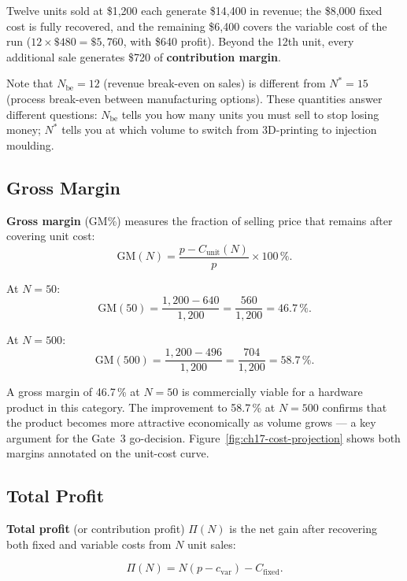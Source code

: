 Twelve units sold at \$1,200 each generate \$14,400 in revenue; the
\$8,000 fixed cost is fully recovered, and the remaining \$6,400 covers
the variable cost of the run ($12 \times \$480 = \$5{,}760$, with \$640
profit).
Beyond the 12th unit, every additional sale generates \$720 of
\textbf{contribution margin}.

Note that $N_{\text{be}} = 12$ (revenue break-even on sales) is different
from $N^{*} = 15$ (process break-even between manufacturing options).
These quantities answer different questions: $N_{\text{be}}$ tells you how
many units you must sell to stop losing money; $N^{*}$ tells you at which
volume to switch from 3D-printing to injection moulding.

\subsection{Gross Margin}
\label{sec:ch17-gm}

\textbf{Gross margin} (GM\%) measures the fraction of
selling price that remains after covering unit cost:
\[
  \text{GM}(N) = \frac{p - C_{\text{unit}}(N)}{p} \times 100\,\%.
\]

At $N = 50$:
\[
  \text{GM}(50) = \frac{1{,}200 - 640}{1{,}200}
               = \frac{560}{1{,}200} = 46.7\,\%.
\]

At $N = 500$:
\[
  \text{GM}(500) = \frac{1{,}200 - 496}{1{,}200}
                = \frac{704}{1{,}200} = 58.7\,\%.
\]

A gross margin of 46.7\,\% at $N = 50$ is commercially viable for a
hardware product in this category.
The improvement to 58.7\,\% at $N = 500$ confirms that the product becomes
more attractive economically as volume grows --- a key argument for the
Gate~3 go-decision.
Figure~\ref{fig:ch17-cost-projection} shows both margins annotated on the
unit-cost curve.

\subsection{Total Profit}
\label{sec:ch17-profit}

\textbf{Total profit} (or contribution profit)
$\Pi(N)$ is the net gain after recovering both fixed and variable costs
from $N$ unit sales:

\begin{equation}
  \Pi(N) = N(p - c_{\text{var}}) - C_{\text{fixed}}.
  \label{eq:ch17-profit}
\end{equation}


